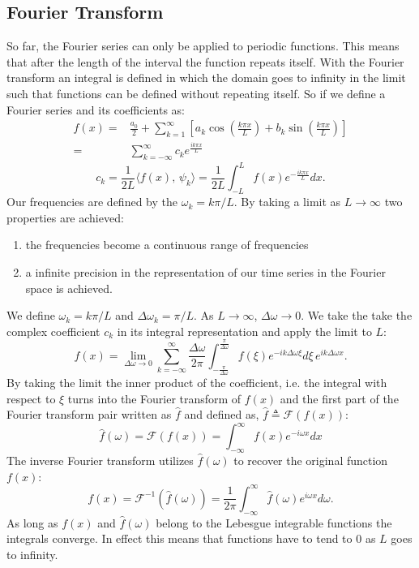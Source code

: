 \documentclass[phd,black, hidelinks]{PrincetonThesis}
\newcommand{\euler}{e}
\begin{document}
\subsection{Fourier Transform}
\label{sec:orga7d59b8}
So far, the Fourier series can only be applied to periodic functions. This means that after the length of the interval the function repeats itself. With the Fourier transform an integral is defined in which the domain goes to infinity in the limit such that functions can be defined without repeating itself. So if we define a Fourier series and its coefficients as:
\begin{equation}
\begin{aligned}
f(x)={} & \frac{a_0}{2} + \sum_{k=1}^{\infty} \left[ a_k \cos\left( \frac{k\pi x}{L} \right) + b_k \sin \left( \frac{k\pi x}{L} \right)  \right] \\
= & \sum_{k=-\infty}^{\infty} c_k \euler^{\frac{ik\pi x}{L}}
\end{aligned}
\end{equation}
\begin{equation}
c_k = \frac{1}{2L} \langle f(x), \, \psi_k \rangle = \frac{1}{2L} \int_{-L}^{L} f(x)\euler^{- \frac{ik\pi x}{L}}dx.
\end{equation}
Our frequencies are defined by the \(\omega_k = k\pi/L\). By taking a limit as \(L \to \infty\) two properties are achieved:
\begin{enumerate}
\item the frequencies become a continuous range of frequencies
\item a infinite precision in the representation of our time series in the Fourier space is achieved.
\end{enumerate}
We define \(\omega_k = k\pi/L\) and \(\Delta \omega_k = \pi /L\). As \(L \to \infty\), \(\Delta \omega \to 0\). We take the take the complex coefficient \(c_k\) in its integral representation and apply the limit to \(L\):
\begin{equation}
f(x) = \lim_{\Delta \omega \to 0} \sum_{k=-\infty}^{\infty} \frac{\Delta \omega}{2\pi} \int_{-\frac{\pi}{\Delta \omega}}^{\frac{\pi}{\Delta \omega}} f(\xi)\euler^{-ik\Delta \omega \xi}d \xi \, e^{ik \Delta \omega x}.
\end{equation}
By taking the limit the inner product of the coefficient, i.e. the integral with respect to \(\xi\) turns into the Fourier transform of \(f(x)\) and the first part of the Fourier transform pair written as \(\hat{f}\) and defined as, \(\hat{f} \triangleq \mathcal{F}(f(x))\):
\begin{equation}
\hat{f}(\omega) = \mathcal{F}(f(x)) = \int_{-\infty}^{\infty} f(x)\euler^{-i\omega x}dx
\end{equation}
The inverse Fourier transform utilizes \(\hat{f}(\omega)\) to recover the original function \(f(x)\):
\begin{equation}
f(x) = \mathcal{F}^{-1}(\hat{f}(\omega)) = \frac{1}{2\pi} \int_{-\infty}^{\infty} \hat{f}(\omega)\euler^{i\omega x}d\omega.
\end{equation}
As long as \(f(x)\) and \(\hat{f}(\omega)\) belong to the Lebesgue integrable functions the integrals converge. In effect this means that functions have to tend to 0 as \(L\) goes to infinity.
\end{document}
